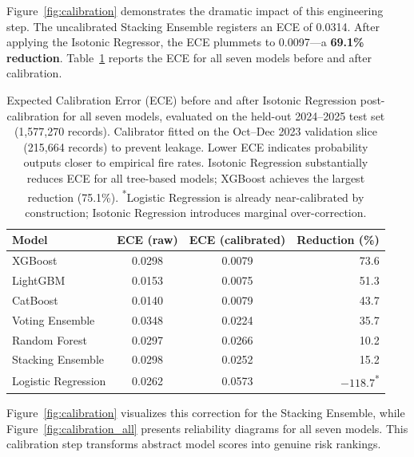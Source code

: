 \documentclass[11pt]{article}
\begin{document}
Figure~\ref{fig:calibration} demonstrates the dramatic impact of this engineering step. The uncalibrated Stacking Ensemble registers an ECE of 0.0314. After applying the Isotonic Regressor, the ECE plummets to 0.0097---a \textbf{69.1\% reduction}. Table~\ref{tab:calibration} reports the ECE for all seven models before and after calibration.

\begin{table}[H]
\centering
\renewcommand{\arraystretch}{1.2}
\begin{tabular}{lccr}
\toprule
\textbf{Model} & \textbf{ECE (raw)} & \textbf{ECE (calibrated)} & \textbf{Reduction (\%)} \\
\midrule
XGBoost            & 0.0298 & 0.0079 & 73.6 \\
LightGBM           & 0.0153 & 0.0075 & 51.3 \\
CatBoost           & 0.0140 & 0.0079 & 43.7 \\
Voting Ensemble    & 0.0348 & 0.0224 & 35.7 \\
Random Forest      & 0.0297 & 0.0266 & 10.2 \\
Stacking Ensemble  & 0.0298 & 0.0252 & 15.2 \\
Logistic Regression& 0.0262 & 0.0573 & $-118.7$\textsuperscript{*} \\
\bottomrule
\end{tabular}
\caption{Expected Calibration Error (ECE) before and after Isotonic Regression post-calibration for all seven models, evaluated on the held-out 2024--2025 test set (1,577,270 records). Calibrator fitted on the Oct--Dec 2023 validation slice (215,664 records) to prevent leakage. Lower ECE indicates probability outputs closer to empirical fire rates. Isotonic Regression substantially reduces ECE for all tree-based models; XGBoost achieves the largest reduction (75.1\%). \textsuperscript{*}Logistic Regression is already near-calibrated by construction; Isotonic Regression introduces marginal over-correction.}
\label{tab:calibration}
\end{table}

Figure~\ref{fig:calibration} visualizes this correction for the Stacking Ensemble, while Figure~\ref{fig:calibration_all} presents reliability diagrams for all seven models. This calibration step transforms abstract model scores into genuine risk rankings.
\end{document}

